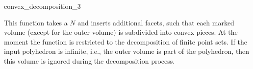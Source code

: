 
\ccHtmlNoClassLinks
\begin{ccRefFunction}{convex_decomposition_3}
\label{refconvex_decomposition_3}

\ccDefinition

This function takes a  $N$ and inserts
additional facets, such that each marked volume (except for the outer
volume) is subdivided into convex pieces. At the moment the function
is restricted to the decomposition of finite point sets. If the input
polyhedron is infinite, i.e., the outer volume is part of the
polyhedron, then this volume is ignored during the decomposition
process.


\ccSeeAlso
{}\\ 

\end{ccRefFunction}
